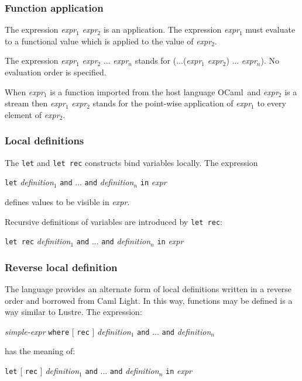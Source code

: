 \documentclass[11pt,titlepage,twoside]{report}
\newcommand{\lustre}{{\sf Lustre}}
\newcommand{\camllight}{{\sf Caml Light}}
\newcommand{\ocaml}{{\sf OCaml}}
\newcommand{\Let}{\mbox{{\tt let}}}
\newcommand{\Rec}{\mbox{{\tt rec}}}
\newcommand{\In}{\mbox{{\tt in}}}
\newcommand{\And}{\mbox{{\tt and}}}
\newcommand{\Where}{\mbox{{\tt where}}}
\newcommand{\term}[1]{{\tt #1}}
\newcommand{\nterm}[1]{{\em #1}}
\begin{document}
\subsubsection{Function application}
The expression \nterm{expr}$_1$ \nterm{expr}$_2$ is an
application. The expression \nterm{expr}$_1$ must evaluate to a
functional value which is applied to the value of \nterm{expr}$_2$.

The expression \nterm{expr}$_1$ \nterm{expr}$_2$ ... \nterm{expr}$_n$
stands for (...(\nterm{expr}$_1$ \nterm{expr}$_2$) ...
\nterm{expr}$_n$). No evaluation order is specified.

When \nterm{expr}$_1$ is a function imported from the host language
\ocaml\ and \nterm{expr}$_2$ is a stream then \nterm{expr}$_1$
\nterm{expr}$_2$ stands for the point-wise application of
\nterm{expr}$_1$ to every element of \nterm{expr}$_2$.

\subsubsection{Local definitions}
The \term{\Let} and \term{\Let\ \Rec} constructs bind variables
locally. The expression 
\begin{center}
  \term{\Let} \nterm{definition}$_1$ \term{\And} ... 
  \term{\And} \nterm{definition}$_n$ \term{\In} \nterm{expr}
\end{center}
defines values to be visible in \nterm{expr}.

Recursive definitions of variables are introduced by \term{\Let\ \Rec}:
\begin{center}
  \term{\Let\ \Rec} \nterm{definition}$_1$ \term{\And} ... 
  \term{\And} \nterm{definition}$_n$ \term{\In} \nterm{expr}
\end{center}

\subsubsection{Reverse local definition}
The language provides an alternate form of local definitions written
in a reverse order and borrowed from \camllight.  In this way,
functions may be defined is a way similar to \lustre. The expression:
\begin{center}
  \nterm{simple-expr} \term{\Where} [ \term{\Rec} ] 
  \nterm{definition}$_1$ \term{\And} ... \term{\And} \nterm{definition}$_n$
\end{center}
has the meaning of:
\begin{center}
  \term{\Let} [ \term{\Rec} ] 
  \nterm{definition}$_1$ \term{\And} ... \term{\And} \nterm{definition}$_n$
  \term{\In} \nterm{expr}
\end{center}
\end{document}

